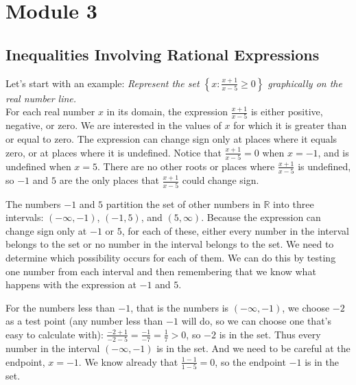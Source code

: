 \documentclass[11pt]{book}               %
\newtheorem{example}{Example}
\begin{document}
\chapter{Module 3}

\section{Inequalities Involving Rational Expressions}

 Let's start with an example: %
\emph{{Represent the set $\left\{x:\frac{x+1}{x-5} \geq 0\right\}$ graphically on the real number line.}}\\


For each real number $x$ in its domain, the expression $\frac{x+1}{x-5}$ is either positive, negative, or zero.
We are interested in the values of $x$ for which it is greater than or equal to zero.
The expression can change sign only at places where it equals zero, or at places where it is undefined.
Notice that $\frac{x+1}{x-5}=0$  when $x=-1$, and is undefined  when $x=5$. 
There are no other roots or places where $\frac{x+1}{x-5}$ is undefined, 
so $-1$ and $5$ are the only places that $\frac{x+1}{x-5}$ could change sign. 

The numbers $-1$ and $5$ partition the set of other numbers in $\mathbb{R}$ into three intervals: 
$(-\infty, -1)$, $(-1, 5)$, and $(5, \infty)$.  
Because the expression can change sign only at $-1$ or $5$, for each of these, either every number in the interval belongs to the set or no number in the interval belongs to the set.
We need to determine which possibility occurs for each of them.
We can do this by testing one number from each interval and then remembering that we know 
what happens with the expression at $-1$ and $5$.

For the numbers less than $-1$, that is the numbers is $(-\infty, -1)$, we choose $-2$ as a test point (any number less than $-1$ will do, so we can choose one that's easy to calculate with):
$\frac{-2+1}{-2-5}=\frac{-1}{-7}=\frac{1}{7}>0$, so $-2$ is in the set.  Thus every number in the interval $(-\infty, -1)$ is in the set.
And we need to be careful at the endpoint, $x = -1$.
We know already that $\frac{1-1}{1-5}=0$, so the endpoint $-1$ is in the set. 
\end{document}

